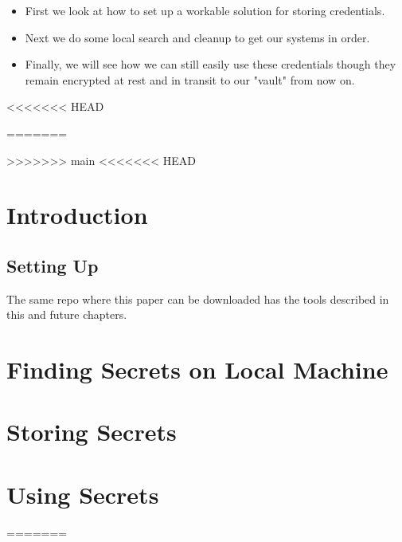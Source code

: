 \documentclass[11pt]{report}
\begin{document}
    \begin{itemize}
    	\item First we look at how to set up a workable solution for storing credentials.
		\item Next we do some local search and cleanup to get our systems in order.
		\item Finally, we will see how we can still easily use these credentials though
			they remain encrypted at rest and in transit to our "vault" from now on.
    \end{itemize}
<<<<<<< HEAD

	\cleardoublepage


=======
      
	\cleardoublepage
	
	
>>>>>>> main
	\tableofcontents
	\thispagestyle{empty}
	\cleardoublepage
	\setcounter{page}{1}
<<<<<<< HEAD


	\chapter{Introduction}
	\lipsum[1]

	\section{Setting Up}

	The same repo where this paper can be downloaded has the tools described in this and future chapters.

	\chapter{Finding Secrets on Local Machine}

	\lipsum[1]

	\chapter{Storing Secrets}

	\lipsum[1]

	\chapter{Using Secrets}

	\lipsum[1]

=======
	
\end{document}
